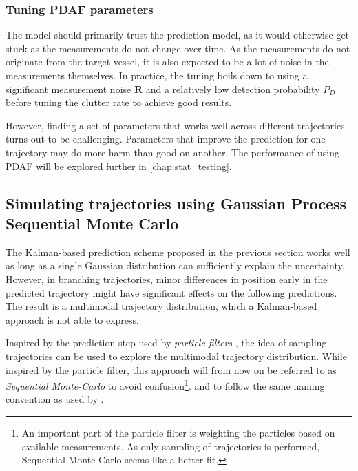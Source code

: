 \subsubsection{Tuning PDAF parameters}
The model should primarily trust the prediction model, as it would otherwise get stuck as the measurements do not change over time. As the measurements do not originate from the target vessel, it is also expected to be a lot of noise in the measurements themselves. In practice, the tuning boils down to using a significant measurement noise $\boldsymbol{R}$ and a relatively low detection probability $P_D$ before tuning the clutter rate to achieve good results.

However, finding a set of parameters that works well across different trajectories turns out to be challenging. Parameters that improve the prediction for one trajectory may do more harm than good on another. The performance of using PDAF will be explored further in \cref{chap:stat_testing}.

\subsection{Simulating trajectories using Gaussian Process Sequential Monte Carlo}
The Kalman-based prediction scheme proposed in the previous section works well as long as a single Gaussian distribution can sufficiently explain the uncertainty. However, in branching trajectories, minor differences in position early in the predicted trajectory might have significant effects on the following predictions. The result is a multimodal trajectory distribution, which a Kalman-based approach is not able to express.

Inspired by the prediction step used by \textit{particle filters} \cite{sensorfusjon}, the idea of sampling trajectories can be used to explore the multimodal trajectory distribution. While inspired by the particle filter, this approach will from now on be referred to as \textit{Sequential Monte-Carlo} to avoid confusion\footnote{An important part of the particle filter is weighting the particles based on available measurements. As only sampling of trajectories is performed, Sequential Monte-Carlo seems like a better fit.}. and to follow the same naming convention as used by \cite{pedestrian}.


